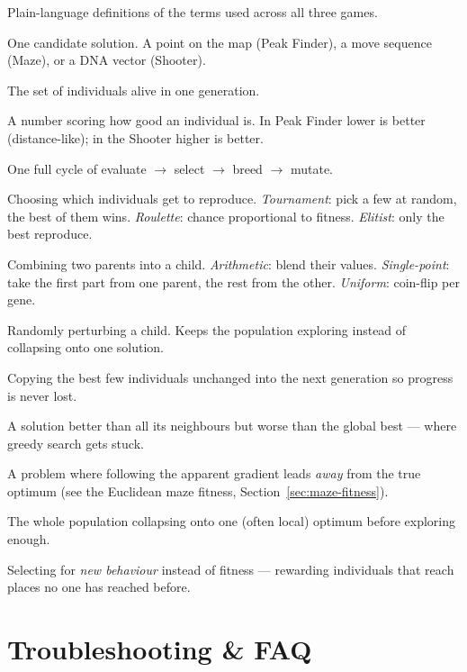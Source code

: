\documentclass[11pt,a4paper]{report}
\begin{document}
Plain-language definitions of the terms used across all three games.

\begin{description}[style=nextline]
  \item[Individual] One candidate solution. A point on the map (Peak
    Finder), a move sequence (Maze), or a DNA vector (Shooter).
  \item[Population] The set of individuals alive in one generation.
  \item[Fitness] A number scoring how good an individual is. In Peak Finder
    lower is better (distance-like); in the Shooter higher is better.
  \item[Generation] One full cycle of evaluate $\to$ select $\to$ breed
    $\to$ mutate.
  \item[Selection] Choosing which individuals get to reproduce.
    \emph{Tournament}: pick a few at random, the best of them wins.
    \emph{Roulette}: chance proportional to fitness.
    \emph{Elitist}: only the best reproduce.
  \item[Crossover] Combining two parents into a child.
    \emph{Arithmetic}: blend their values. \emph{Single-point}: take the
    first part from one parent, the rest from the other. \emph{Uniform}:
    coin-flip per gene.
  \item[Mutation] Randomly perturbing a child. Keeps the population
    exploring instead of collapsing onto one solution.
  \item[Elitism] Copying the best few individuals unchanged into the next
    generation so progress is never lost.
  \item[Local optimum] A solution better than all its neighbours but worse
    than the global best --- where greedy search gets stuck.
  \item[Deceptive landscape] A problem where following the apparent
    gradient leads \emph{away} from the true optimum (see the Euclidean
    maze fitness, Section~\ref{sec:maze-fitness}).
  \item[Premature convergence] The whole population collapsing onto one
    (often local) optimum before exploring enough.
  \item[Novelty search] Selecting for \emph{new behaviour} instead of
    fitness --- rewarding individuals that reach places no one has reached
    before.
\end{description}

\chapter{Troubleshooting \& FAQ}
\end{document}

